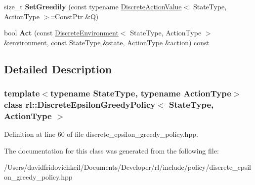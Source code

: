 \begin{DoxyCompactItemize}
size\+\_\+t {\bfseries Set\+Greedily} (const typename \hyperlink{structrl_1_1_discrete_action_value}{Discrete\+Action\+Value}$<$ State\+Type, Action\+Type $>$\+::Const\+Ptr \&Q)
\item 
\hypertarget{classrl_1_1_discrete_epsilon_greedy_policy_a54e5c8fa9e5f473cfc1dd240c779728e}{}\label{classrl_1_1_discrete_epsilon_greedy_policy_a54e5c8fa9e5f473cfc1dd240c779728e} 
bool {\bfseries Act} (const \hyperlink{classrl_1_1_discrete_environment}{Discrete\+Environment}$<$ State\+Type, Action\+Type $>$ \&environment, const State\+Type \&state, Action\+Type \&action) const
\end{DoxyCompactItemize}


\subsection{Detailed Description}
\subsubsection*{template$<$typename State\+Type, typename Action\+Type$>$\newline
class rl\+::\+Discrete\+Epsilon\+Greedy\+Policy$<$ State\+Type, Action\+Type $>$}



Definition at line 60 of file discrete\+\_\+epsilon\+\_\+greedy\+\_\+policy.\+hpp.



The documentation for this class was generated from the following file\+:\begin{DoxyCompactItemize}
\item 
/\+Users/davidfridovichkeil/\+Documents/\+Developer/rl/include/policy/discrete\+\_\+epsilon\+\_\+greedy\+\_\+policy.\+hpp\end{DoxyCompactItemize}
